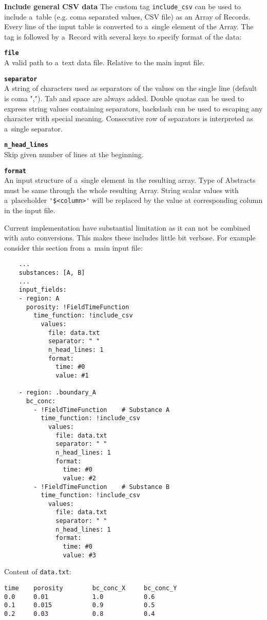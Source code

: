 {\bf Include general CSV data}
The custom tag \verb'include_csv' can be used to include a~table (e.g. coma separated values, CSV file) as an Array of Records. 
Every line of the input table is converted to a~single element of the Array.
The tag is followed by a~Record with several keys to specify format of the data:
\begin{description}
  \item {\bf\verb'file'} \\A valid path to a~text data file. Relative to the main input file.
  \item {\bf\verb'separator'}\\ A string of characters used as separators of the values on the single line (default is coma ",").
  Tab and space are always added. Double quotas can be used to express string values containing separators, 
  backslash can be used to escaping any character with special meaning. Consecutive row of separators is interpreted as a~single separator. 
  \item {\bf\verb'n_head_lines'}\\ Skip given number of lines at the beginning.
  \item {\bf\verb'format'}\\ An input structure of a~single element in the resulting array. Type of Abstracts must be same through 
  the whole resulting Array. String scalar values with a~placeholder \verb|'$<column>'| will be replaced by the value 
  at corresponding column in the input file.
\end{description}

Current implementation have substantial limitation as it can not be combined with auto conversions. This makes these includes
little bit verbose. For example consider this section from a~main input file:
\begin{verbatim}
    ...
    substances: [A, B]
    ...    
    input_fields:
    - region: A
      porosity: !FieldTimeFunction
        time_function: !include_csv
          values:
            file: data.txt  
            separator: " "
            n_head_lines: 1
            format: 
              time: #0
              value: #1
              
    - region: .boundary_A        
      bc_conc: 
        - !FieldTimeFunction    # Substance A
          time_function: !include_csv
            values:
              file: data.txt  
              separator: " "
              n_head_lines: 1
              format: 
                time: #0
                value: #2
        - !FieldTimeFunction    # Substance B
          time_function: !include_csv
            values:
              file: data.txt  
              separator: " "
              n_head_lines: 1
              format: 
                time: #0
                value: #3
\end{verbatim}
Content of \verb'data.txt':
\begin{verbatim}
time    porosity        bc_conc_X     bc_conc_Y
0.0     0.01            1.0           0.6
0.1     0.015           0.9           0.5
0.2     0.03            0.8           0.4
\end{verbatim}

